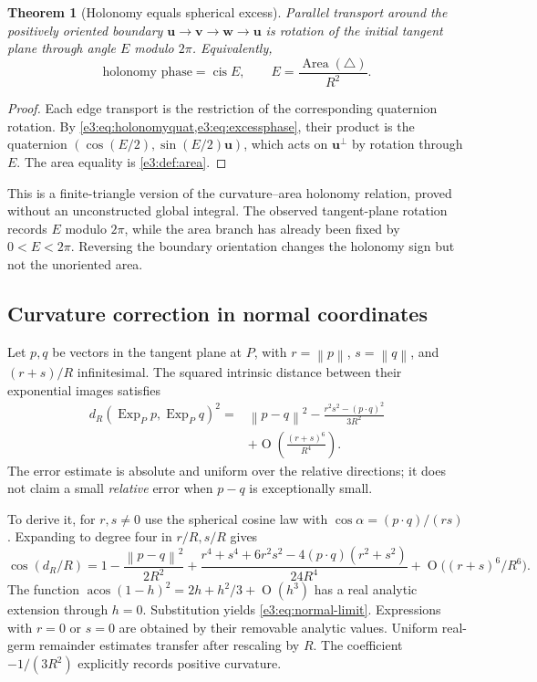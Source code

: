 \documentclass[11pt,letterpaper]{article}
\numberwithin{equation}{section}
\newtheorem{theorem}{Theorem}[section]
\theoremstyle{definition}
\theoremstyle{remark}
\newcommand{\cis}{\operatorname{cis}}
\newcommand{\acos}{\operatorname{acos}}
\newcommand{\area}{\operatorname{Area}}
\newcommand{\norm}[1]{\left\lVert#1\right\rVert}
\newcommand{\vv}[1]{\bm{#1}}
\newcommand{\smallO}{\operatorname{O}}
\begin{document}
\begin{theorem}[Holonomy equals spherical excess]\label{e3:thm:holonomy}
Parallel transport around the positively oriented boundary
$\vv u\to\vv v\to\vv w\to\vv u$ is rotation of the initial tangent
plane through angle $E$ modulo $2\pi$. Equivalently,
\[
 \text{holonomy phase}=\cis E,
 \qquad E=\frac{\area(\triangle)}{R^2}.
\]
\end{theorem}
\begin{proof}
Each edge transport is the restriction of the corresponding quaternion
rotation. By \cref{e3:eq:holonomyquat,e3:eq:excessphase}, their product is the
quaternion $(\cos(E/2),\sin(E/2)\vv u)$, which acts on
$\vv u^\perp$ by rotation through $E$. The area equality is
\cref{e3:def:area}.
\end{proof}

This is a finite-triangle version of the curvature--area holonomy relation,
proved without an unconstructed global integral. The observed tangent-plane
rotation records $E$ modulo $2\pi$, while the area branch has already been
fixed by $0<E<2\pi$. Reversing the boundary orientation changes the holonomy
sign but not the unoriented area.

\subsection{Curvature correction in normal coordinates}\label{e3:subsec:normal-limit}

Let $p,q$ be vectors in the tangent plane at $P$, with
$r=\norm p$, $s=\norm q$, and $(r+s)/R$ infinitesimal. The squared intrinsic
distance between their exponential images satisfies
\begin{equation}\label{e3:eq:normal-limit}
 \begin{split}
 d_R(\operatorname{Exp}_P p,\operatorname{Exp}_P q)^2
  ={}&\norm{p-q}^2
  -\frac{r^2s^2-(p\cdot q)^2}{3R^2}\\
  &+\smallO\left(\frac{(r+s)^6}{R^4}\right).
 \end{split}
\end{equation}
The error estimate is absolute and uniform over the relative directions;
it does not claim a small \emph{relative} error when $p-q$ is exceptionally
small.

To derive it, for $r,s\ne0$ use the spherical cosine law with
$\cos\alpha=(p\cdot q)/(rs)$. Expanding to degree four in $r/R,s/R$ gives
\[
 \cos(d_R/R)=1-\frac{\norm{p-q}^2}{2R^2}
 +\frac{r^4+s^4+6r^2s^2-4(p\cdot q)(r^2+s^2)}{24R^4}
 +\smallO\bigl((r+s)^6/R^6\bigr).
\]
The function $\acos(1-h)^2=2h+h^2/3+\smallO(h^3)$ has a real analytic
extension through $h=0$. Substitution yields \cref{e3:eq:normal-limit}. Expressions with
$r=0$ or $s=0$ are obtained by their removable analytic values. Uniform
real-germ remainder estimates transfer after rescaling by $R$.
The coefficient $-1/(3R^2)$ explicitly records positive curvature.
\end{document}
